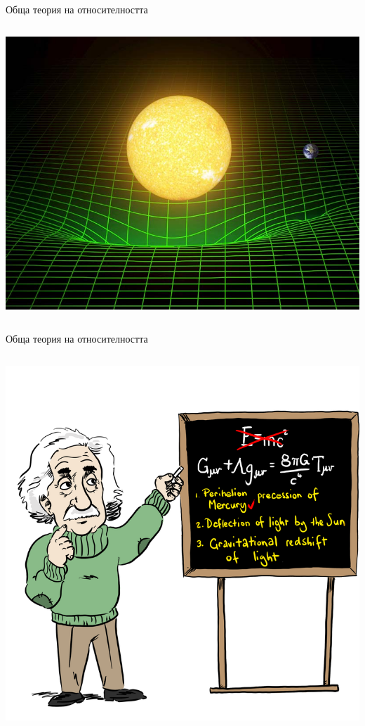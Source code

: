 \documentclass[10pt,a4paper]{beamer}
\begin{document}
        \begin{frame}{ Обща теория на относителността }
            \begin{columns}
                \begin{column}{0.8\textwidth}
                    \includegraphics[width=\textwidth]{images/gr_spacetime.jpeg}
                \end{column}
            \end{columns}
        \end{frame}
    
        \begin{frame}{ Обща теория на относителността }
            \begin{columns}
                \begin{column}{0.5\textwidth}
                    \includegraphics[width=\textwidth]{images/einstein_gr.png}
                \end{column}
            \end{columns}
        \end{frame}
        
\end{document}
